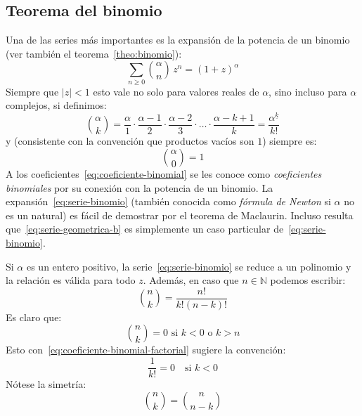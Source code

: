\subsection{Teorema del binomio}
\label{sec:teorema-binomio}

  Una de las series más importantes
  es la expansión de la potencia de un binomio
  (ver también el teorema~\ref{theo:binomio}):
  \begin{equation}
    \label{eq:serie-binomio}
    \sum_{n \ge 0} \binom{\alpha}{n} \, z^n
       = (1 + z)^\alpha
  \end{equation}
  Siempre que \(\lvert z \rvert < 1\)
  esto vale no solo para valores reales de \(\alpha\),
  sino incluso para \(\alpha\) complejos,
  si definimos:
  \begin{equation}
    \label{eq:coeficiente-binomial}
    \binom{\alpha}{k}
       = \frac{\alpha}{1} \cdot \frac{\alpha - 1}{2}
	    \cdot \frac{\alpha - 2}{3}
	    \cdot \dots
	    \cdot \frac{\alpha - k + 1}{k}
       = \frac{\alpha^{\underline{k}}}{k!}
  \end{equation}
  y (consistente con la convención que productos vacíos son \(1\))
  siempre es:
  \begin{equation}
    \label{eq:binomial(alpha,0)}
    \binom{\alpha}{0}
      = 1
  \end{equation}
  A los coeficientes~\eqref{eq:coeficiente-binomial}
  se les conoce como \emph{coeficientes binomiales}
  por su conexión con la potencia de un binomio.
  La expansión~\eqref{eq:serie-binomio}
  (también conocida como \emph{fórmula de Newton}
   si \(\alpha\) no es un natural)
  es fácil de demostrar por el teorema de Maclaurin.
  Incluso resulta que~\eqref{eq:serie-geometrica-b} es simplemente
  un caso particular de~\eqref{eq:serie-binomio}.

  Si \(\alpha\) es un entero positivo,
  la serie~\eqref{eq:serie-binomio} se reduce a un polinomio
  y la relación es válida para todo \(z\).
  Además,
  en caso que \(n \in \mathbb{N}\)
  podemos escribir:
  \begin{equation}
    \label{eq:coeficiente-binomial-factorial}
    \binom{n}{k}
       = \frac{n!}{k! (n - k)!}
  \end{equation}
  Es claro que:
  \begin{equation}
    \label{eq:coeficiente-binomial-contorno}
    \binom{n}{k}
      = 0 \text{\ si \(k < 0\) o \(k > n\)}
  \end{equation}
  Esto con~\eqref{eq:coeficiente-binomial-factorial}
  sugiere la convención:
  \begin{equation}
    \label{eq:1/k!-convention}
    \frac{1}{k!}
      = 0 \quad \text{si \(k < 0\)}
  \end{equation}
  Nótese la simetría:
  \begin{equation}
    \label{eq:coeficiente-binomial-simetria}
    \binom{n}{k}
      = \binom{n}{n - k}
  \end{equation}

